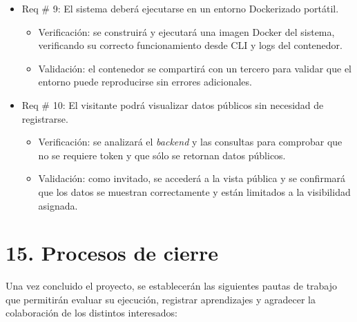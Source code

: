 \documentclass[
11pt, %
]{charter}
\begin{document}
\begin{itemize}
	\item Req \# 9: El sistema deberá ejecutarse en un entorno Dockerizado portátil.
	\begin{itemize}
		\item Verificación: se construirá y ejecutará una imagen Docker del sistema, verificando su correcto funcionamiento desde CLI y logs del contenedor.
		\item Validación: el contenedor se compartirá con un tercero para validar que el entorno puede reproducirse sin errores adicionales.
	\end{itemize}
	
	\item Req \# 10: El visitante podrá visualizar datos públicos sin necesidad de registrarse.
	\begin{itemize}
		\item Verificación: se analizará el \textit{backend} y las consultas para comprobar que no se requiere token y que sólo se retornan datos públicos.
		\item Validación: como invitado, se accederá a la vista pública y se confirmará que los datos se muestran correctamente y están limitados a la visibilidad asignada.
	\end{itemize}

\end{itemize}

\section{15. Procesos de cierre}    
\label{sec:cierre}

Una vez concluido el proyecto, se establecerán las siguientes pautas de trabajo que permitirán evaluar su ejecución, registrar aprendizajes y agradecer la colaboración de los distintos interesados:
\end{document}

